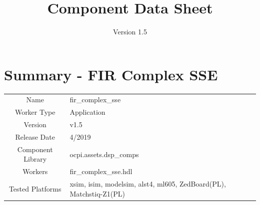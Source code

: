 \def\importpath{}

\def\docTitle{Component Data Sheet}
\def\docVersion{1.5}
\date{Version \docVersion} %
\title{\docTitle}
\lhead{\small{\docTitle}}

\def\comp{fir\_complex\_sse}
\edef\ecomp{fir_complex_sse}
\def\Comp{FIR Complex SSE}
\graphicspath{ {figures/} }



\section*{Summary - \Comp}

\begin{tabular}{|c|M{13.5cm}|}
	\hline
	                  &                                                              \\
	\hline
	Name              & \comp                                                        \\
	\hline
	Worker Type       & Application                                                  \\
	\hline
	Version           & v\docVersion \\
	\hline
	Release Date      & 4/2019 \\
	\hline
	Component Library & ocpi.assets.dsp\_comps                                        \\
	\hline
	Workers           & \comp.hdl                                                    \\
	\hline
	Tested Platforms  & xsim, isim, modelsim, alst4, ml605, ZedBoard(PL), Matchstiq-Z1(PL) \\
	\hline
\end{tabular}

